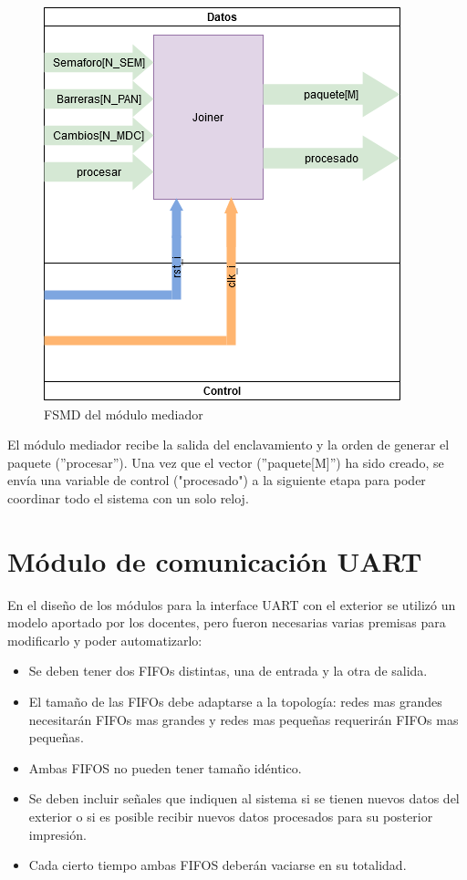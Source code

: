 		\begin{figure}[hbt]
		\centering
			\includegraphics[scale=.48]{./Figures/FSMD-Mediador}
			\caption{FSMD del módulo mediador}
			\label{fig:FSMD_Mediador}
		\end{figure}
		
		\vspace{10cm}
		
		El módulo mediador recibe la salida del enclavamiento y la orden de generar el paquete (''procesar''). Una vez que el vector (''paquete[M]'') ha sido creado, se envía una variable de control ("procesado") a la siguiente etapa para poder coordinar todo el sistema con un solo reloj.


		
\section{Módulo de comunicación UART}

	En el diseño de los módulos para la interface UART con el exterior se utilizó un modelo  aportado por los docentes, pero fueron necesarias varias premisas para modificarlo y poder automatizarlo:
	
	\begin{itemize}
		\item Se deben tener dos FIFOs distintas, una de entrada y la otra de salida.
		\item El tamaño de las FIFOs debe adaptarse a la topología: redes mas grandes necesitarán FIFOs mas grandes y redes mas pequeñas requerirán FIFOs mas pequeñas.
		\item Ambas FIFOS no pueden tener tamaño idéntico.
		\item Se deben incluir señales que indiquen al sistema si se tienen nuevos datos del exterior o si es posible recibir nuevos datos procesados para su posterior impresión.
		\item Cada cierto tiempo ambas FIFOS deberán vaciarse en su totalidad.		
	\end{itemize}
	
